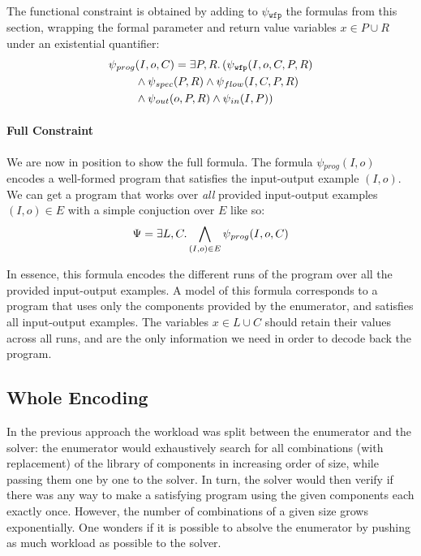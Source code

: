 The functional constraint is obtained by adding to $\psi{}_{\mathtt{wfp}}$ the
formulas from this section, wrapping the formal parameter and return value
variables $x \in P \cup R$ under an existential quantifier:
%
\begin{align*}
  \psi{}_{prog}&(I, o, C) = \exists P,R\ldotp
                 (\psi{}_{\mathtt{wfp}}(I, o, C, P, R)\\
               &\wedge \psi{}_{spec}(P, R) \wedge \psi{}_{flow}(I, C, P, R)\\
               &\wedge \psi{}_{out}(o, P, R) \wedge \psi{}_{in}(I, P))
\end{align*}

\paragraph{Full Constraint}
\label{sec:full-constraint}

We are now in position to show the full formula. The formula $\psi{}_{prog}(I,
o)$ encodes a well-formed program that satisfies the input-output example $(I,
o)$. We can get a program that works over \textit{all} provided
input-output examples $(I, o) \in E$ with a simple conjuction over $E$ like so:
%
\[
  \Psi{} = \exists L,C\ldotp \bigwedge_{(I, o) \in E}\psi{}_{prog}(I, o, C)
\]

\noindent
In essence, this formula encodes the different runs of the program over all
the provided input-output examples. A model of this formula corresponds to a
program that uses only the components provided by the enumerator, and satisfies
all input-output examples. The variables $x \in L \cup C$ should retain their
values across all runs, and are the only information we need in order to decode
back the program.

\subsection{Whole Encoding}
\label{sec:whole-encoding}

In the previous approach the workload was split between the enumerator and the
solver: the enumerator would exhaustively search for all combinations (with
replacement) of the library of components in increasing order of size, while
passing them one by one to the solver. In turn, the solver would then verify if
there was any way to make a satisfying program using the given components each
exactly once. However, the number of combinations of a given size grows
exponentially. One wonders if it is possible to absolve the enumerator by
pushing as much workload as possible to the solver.

